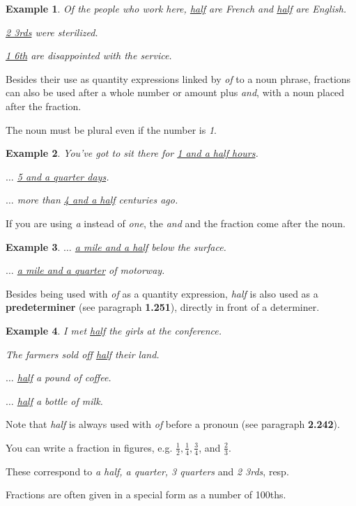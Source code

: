 \documentclass[oneside]{book}
\numberwithin{equation}{section}
\newtheorem{example}{Example}[section]
\begin{document}
\begin{example}
    Of the people who work here, \underline{half} are French and \underline{half} are English.
    
    \underline{2 3rds} were sterilized.
    
    \underline{1 6th} are disappointed with the service.
\end{example}
%
\noindent{} Besides their use as quantity expressions linked by \textit{of} to a noun phrase, fractions can also be used after a whole number or amount plus \textit{and}, with a noun placed after the fraction.

The noun must be plural even if the number is \textit{1}.
\begin{example}
    You've got to sit there for \underline{1 and a half hours}.
    
    $\ldots$ \underline{5 and a quarter days}.
    
    $\ldots$ more than \underline{4 and a half} centuries ago.
\end{example}
If you are using \textit{a} instead of \textit{one}, the \textit{and} and the fraction come after the noun.
\begin{example}
    $\ldots$ \underline{a mile and a half} below the surface.
    
    $\ldots$ \underline{a mile and a quarter} of motorway.
\end{example}
%
\noindent{} Besides being used with \textit{of} as a quantity expression, \textit{half} is also used as a \textbf{predeterminer} (see paragraph \textbf{1.251}), directly in front of a determiner.
\begin{example}
    I met \underline{half} the girls at the conference.
    
    The farmers sold off \underline{half} their land.
    
   $\ldots$ \underline{half} a pound of coffee.
   
   $\ldots$ \underline{half} a bottle of milk.
\end{example}
Note that \textit{half} is always used with \textit{of} before a pronoun (see paragraph \textbf{2.242}).

%
\noindent{} You can write a fraction in figures, e.g. $\frac{1}{2},\frac{1}{4},\frac{3}{4}$, and $\frac{2}{3}$.

These correspond to \textit{a half, a quarter, 3 quarters} and \textit{2 3rds}, resp.

%
\noindent{} Fractions are often given in a special form as a number of 100ths.
\end{document}
